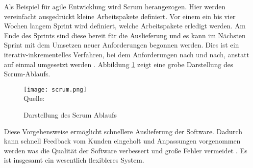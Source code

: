Als Beispiel für agile Entwicklung wird Scrum herangezogen.
Hier werden vereinfacht ausgedrückt kleine Arbeitspakete definiert.
Vor einem ein bis vier Wochen langem Sprint wird definiert, welche Arbeitspakete
erledigt werden. Am Ende des Sprints sind diese bereit für die Auslieferung und
es kann im Nächsten Sprint mit dem Umsetzen neuer Anforderungen begonnen werden.
Dies ist ein iterativ-inkrementelles Verfahren, bei dem Anforderungen nach und nach,
anstatt auf einmal umgesetzt werden \cite{DietmarAbts2017}.
Abbildung \ref{fig:scrum} zeigt eine grobe Darstellung des Scrum-Ablaufs.

\begin{figure}[H]
    \centering
    \caption{Darstellung des Scrum Ablaufs }
	\label{fig:scrum}
    \texttt{[image: scrum.png]}
    \\
    Quelle: \cite{DietmarAbts2017}
\end{figure}

Diese Vorgehensweise ermöglicht schnellere Auslieferung der Software.
Dadurch kann schnell Feedback vom Kunden eingeholt und Anpassungen vorgenommen werden
was die Qualität der Software verbessert und große Fehler vermeidet \cite{DietmarAbts2017}.
Es ist insgesamt ein wesentlich flexibleres System.